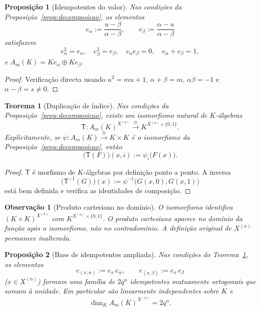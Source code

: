 \documentclass[11pt,a4paper]{article}
\newtheorem{teorema}{Teorema}
\newtheorem{proposicao}{Proposição}
\newtheorem{observacao}{Observação}
\begin{document}
\begin{proposicao}[Idempotentes do valor]
\label{prop:idempotentes-valor}
Nas condições da Proposição~\ref{prop:decomposicao}, os elementos
\[
e_\alpha := \frac{u-\beta}{\alpha-\beta},
\qquad
e_\beta := \frac{\alpha-u}{\alpha-\beta}
\]
satisfazem
\[
e_\alpha^2=e_\alpha,\quad
e_\beta^2=e_\beta,\quad
e_\alpha e_\beta=0,\quad
e_\alpha+e_\beta=1,
\]
e \(A_m(K)=K e_\alpha\oplus K e_\beta\).
\end{proposicao}

\begin{proof}
Verificação directa usando \(u^2=mu+1\), \(\alpha+\beta=m\),
\(\alpha\beta=-1\) e \(\alpha-\beta=s\neq 0\).
\end{proof}

\begin{teorema}[Duplicação de índice]
\label{thm:duplicacao}
Nas condições da Proposição~\ref{prop:decomposicao}, existe um isomorfismo
natural de \(K\)-álgebras
\[
\mathsf T\colon A_m(K)^{X^{(n)}}
\xrightarrow{\;\cong\;}
K^{X^{(n)}\times\{0,1\}}.
\]
Explicitamente, se \(\psi\colon A_m(K)\xrightarrow{\cong}K\times K\) é o
isomorfismo da Proposição~\ref{prop:decomposicao}, então
\[
\bigl(\mathsf T(F)\bigr)(x,i) := \psi_i\bigl(F(x)\bigr).
\]
\end{teorema}

\begin{proof}
\(\mathsf T\) é morfismo de \(K\)-álgebras por definição ponto a ponto.
A inversa
\[
\bigl(\mathsf T^{-1}(G)\bigr)(x)
:= \psi^{-1}\bigl(G(x,0),G(x,1)\bigr)
\]
está bem definida e verifica as identidades de composição.
\end{proof}

\begin{observacao}[Produto cartesiano no domínio]
\label{obs:dominio}
O isomorfismo identifica \((K\times K)^{X^{(n)}}\) com
\(K^{X^{(n)}\times\{0,1\}}\).
O produto cartesiano aparece no \emph{domínio} da função após o isomorfismo,
não no contradomínio.
A definição original de \(X^{(n)}\) permanece inalterada.
\end{observacao}

\begin{proposicao}[Base de idempotentes ampliada]
\label{prop:idempotentes-ampliados}
Nas condições do Teorema~\ref{thm:duplicacao}, os elementos
\[
e_{(x,\alpha)} := e_x\, e_\alpha,
\qquad
e_{(x,\beta)} := e_x\, e_\beta
\]
(\(x\in X^{(n)}\)) formam uma família de \(2q^n\) idempotentes mutuamente
ortogonais que somam à unidade.
Em particular são linearmente independentes sobre \(K\) e
\[
\dim_K A_m(K)^{X^{(n)}} = 2q^n.
\]
\end{proposicao}
\end{document}
